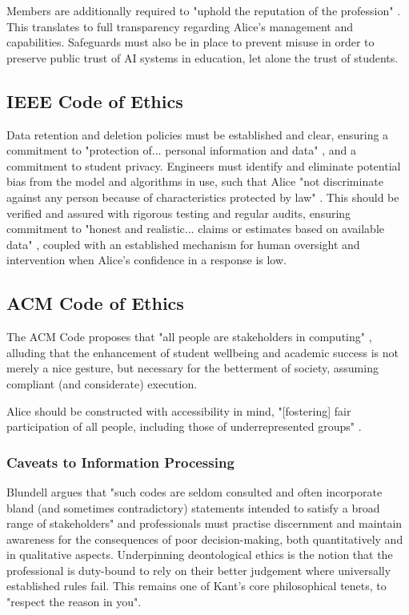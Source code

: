 \documentclass[14pt,a4paper]{article}
\begin{document}
\begin{multicols}{2}
Members are additionally required to "uphold the reputation of the profession" \textit{\parencite[p. 3]{BCS2024}}.
This translates to full transparency regarding Alice's management and capabilities.
Safeguards must also be in place to prevent misuse in order to preserve public trust of AI systems in education, let alone the trust of students.

\subsection{IEEE Code of Ethics}
Data retention and deletion policies must be established and clear, ensuring a commitment to "protection of... personal information and data" \textit{\parencite[p. 1]{IEEE2024}}, and a commitment to student privacy.
Engineers must identify and eliminate potential bias from the model and algorithms in use, such that Alice "not discriminate against any person because of characteristics protected by law" \textit{\parencite[p. 1]{IEEE2024}}.
This should be verified and assured with rigorous testing and regular audits, ensuring commitment to "honest and realistic... claims or estimates based on available data" \textit{\parencite[p. 2]{IEEE2024}}, coupled with an established mechanism for human oversight and intervention when Alice's confidence in a response is low.

\subsection{ACM Code of Ethics}
The ACM Code proposes that "all people are stakeholders in computing" \textit{\parencite[p. 1]{ACM2024}}, alluding that the enhancement of student wellbeing and academic success is not merely a nice gesture, but necessary for the betterment of society, assuming compliant (and considerate) execution.

Alice should be constructed with accessibility in mind, "[fostering] fair participation of all people, including those of underrepresented groups" \textit{\parencite[p. 2]{ACM2024}}.

\subsubsection*{Caveats to Information Processing}
Blundell argues that "such codes are seldom consulted and often incorporate bland (and sometimes contradictory) statements intended to satisfy a broad range of stakeholders" \textit{\parencite[p. 40]{Blundell2020}} and professionals must practise discernment and maintain awareness for the consequences of poor decision-making, both quantitatively and in qualitative aspects.
Underpinning deontological ethics is the notion that the professional is duty-bound to rely on their better judgement where universally established rules fail.
This remains one of Kant's core philosophical tenets, to "respect the reason in you".


\end{multicols}
\end{document}

